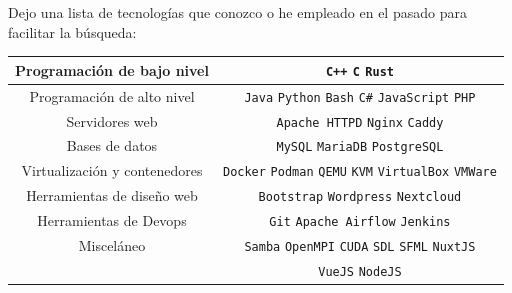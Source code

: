 \documentclass[9pt]{developercv} %
\begin{document}

Dejo una lista de tecnologías que conozco o he empleado en el pasado para facilitar la búsqueda:\\

\begin{tabular}{|c|c|}\hline

  Programación de bajo nivel &
  \texttt{C++}  \slashsep
  \texttt{C}    \slashsep
  \texttt{Rust} \\ \hline

  Programación de alto nivel &
  \texttt{Java}       \slashsep
  \texttt{Python}     \slashsep
  \texttt{Bash}       \slashsep
  \texttt{C\#}        \slashsep
  \texttt{JavaScript} \slashsep
  \texttt{PHP}        \\ \hline

  Servidores web &
  \texttt{Apache HTTPD} \slashsep
  \texttt{Nginx}        \slashsep
  \texttt{Caddy}        \\ \hline

  Bases de datos &
  \texttt{MySQL}      \slashsep
  \texttt{MariaDB}    \slashsep
  \texttt{PostgreSQL} \\ \hline

  Virtualización y contenedores &
  \texttt{Docker}     \slashsep
  \texttt{Podman}     \slashsep
  \texttt{QEMU}       \slashsep
  \texttt{KVM}        \slashsep
  \texttt{VirtualBox} \slashsep
  \texttt{VMWare}     \\ \hline

  Herramientas de diseño web &
  \texttt{Bootstrap}      \slashsep
  \texttt{Wordpress}      \slashsep
  \texttt{Nextcloud}      \\ \hline

  Herramientas de Devops  &
  \texttt{Git}            \slashsep
  \texttt{Apache Airflow} \slashsep
  \texttt{Jenkins}        \\ \hline

  Misceláneo &
  \texttt{Samba}   \slashsep
  \texttt{OpenMPI} \slashsep
  \texttt{CUDA}    \slashsep
  \texttt{SDL}     \slashsep
  \texttt{SFML}    \slashsep
  \texttt{NuxtJS}  \\ &
  \texttt{VueJS}   \slashsep
  \texttt{NodeJS}  \\ \hline

\end{tabular}
\end{document}
